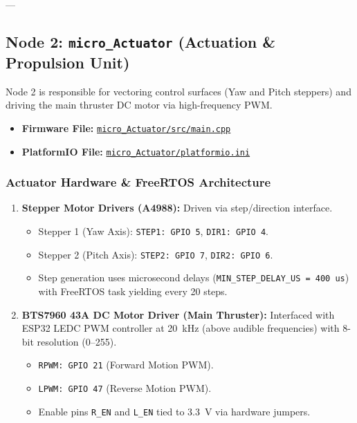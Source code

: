 \documentclass[11pt,a4paper]{article}
\begin{document}
---

\subsection{Node 2: \texttt{micro\_Actuator} (Actuation \& Propulsion Unit)}
Node 2 is responsible for vectoring control surfaces (Yaw and Pitch steppers) and driving the main thruster DC motor via high-frequency PWM.

\begin{itemize}
    \item \textbf{Firmware File:} \href{file:///c:/Users/MP2KC/OneDrive/Documents/PlatformIO/Projects/micro_Actuator/src/main.cpp}{\texttt{micro\_Actuator/src/main.cpp}}
    \item \textbf{PlatformIO File:} \href{file:///c:/Users/MP2KC/OneDrive/Documents/PlatformIO/Projects/micro_Actuator/platformio.ini}{\texttt{micro\_Actuator/platformio.ini}}
\end{itemize}

\subsubsection{Actuator Hardware \& FreeRTOS Architecture}
\begin{enumerate}
    \item \textbf{Stepper Motor Drivers (A4988):} Driven via step/direction interface.
    \begin{itemize}
        \item Stepper 1 (Yaw Axis): \texttt{STEP1: GPIO 5}, \texttt{DIR1: GPIO 4}.
        \item Stepper 2 (Pitch Axis): \texttt{STEP2: GPIO 7}, \texttt{DIR2: GPIO 6}.
        \item Step generation uses microsecond delays (\texttt{MIN\_STEP\_DELAY\_US = 400 us}) with FreeRTOS task yielding every 20 steps.
    \end{itemize}
    \item \textbf{BTS7960 43A DC Motor Driver (Main Thruster):} Interfaced with ESP32 LEDC PWM controller at 20~kHz (above audible frequencies) with 8-bit resolution (0--255).
    \begin{itemize}
        \item \texttt{RPWM: GPIO 21} (Forward Motion PWM).
        \item \texttt{LPWM: GPIO 47} (Reverse Motion PWM).
        \item Enable pins \texttt{R\_EN} and \texttt{L\_EN} tied to 3.3~V via hardware jumpers.
    \end{itemize}
\end{enumerate}
\end{document}
